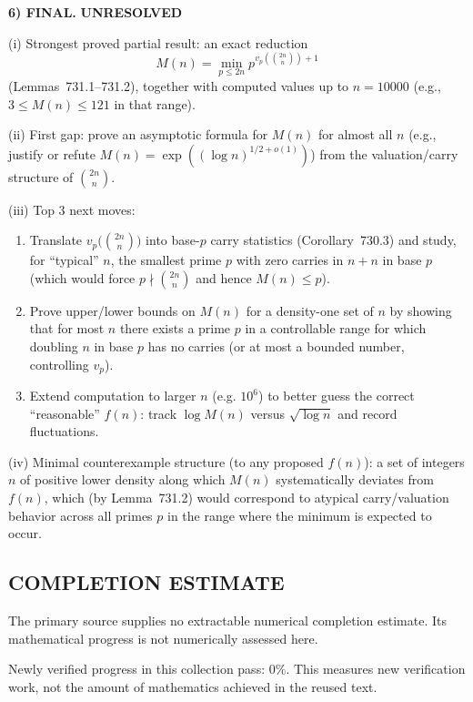 \medskip
\noindent\textbf{6) FINAL.} \textbf{UNRESOLVED}

(i) Strongest proved partial result: an exact reduction
\[M(n)=\min_{p\le 2n} p^{v_p\left(\binom{2n}{n}\right)+1}\]
(Lemmas~731.1--731.2), together with computed values up to $n=10000$ (e.g., $3\le M(n)\le 121$ in that range).

(ii) First gap: prove an asymptotic formula for $M(n)$ for almost all $n$ (e.g., justify or refute $M(n)=\exp((\log n)^{1/2+o(1)})$) from the valuation/carry structure of $\binom{2n}{n}$.

(iii) Top 3 next moves:
\begin{enumerate}
\item Translate $v_p\bigl(\binom{2n}{n}\bigr)$ into base-$p$ carry statistics (Corollary~730.3) and study, for ``typical'' $n$, the smallest prime $p$ with zero carries in $n+n$ in base $p$ (which would force $p\nmid\binom{2n}{n}$ and hence $M(n)\le p$).
\item Prove upper/lower bounds on $M(n)$ for a density-one set of $n$ by showing that for most $n$ there exists a prime $p$ in a controllable range for which doubling $n$ in base $p$ has no carries (or at most a bounded number, controlling $v_p$).
\item Extend computation to larger $n$ (e.g. $10^6$) to better guess the correct ``reasonable'' $f(n)$: track $\log M(n)$ versus $\sqrt{\log n}$ and record fluctuations.
\end{enumerate}

(iv) Minimal counterexample structure (to any proposed $f(n)$): a set of integers $n$ of positive lower density along which $M(n)$ systematically deviates from $f(n)$, which (by Lemma~731.2) would correspond to atypical carry/valuation behavior across all primes $p$ in the range where the minimum is expected to occur.




\subsection*{COMPLETION ESTIMATE}
The primary source supplies no extractable numerical completion estimate. Its mathematical progress is not numerically assessed here.

Newly verified progress in this collection pass: $0\%$. This measures new verification work, not the amount of mathematics achieved in the reused text.
